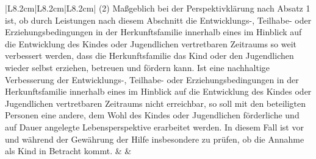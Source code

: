 \documentclass[10pt,a4paper,landscape]{article}
\begin{document}
\begin{longtable}{|L{8.2cm}|L{8.2cm}|L{8.2cm}|}
\textcolor{diffred}{(2) Maßgeblich bei der Perspektivklärung  \newline nach Absatz 1 ist, ob durch Leistungen  \newline nach diesem Abschnitt die Entwicklungs-,  \newline Teilhabe- oder Erziehungsbedingungen in  \newline der Herkunftsfamilie innerhalb eines im  \newline Hinblick auf die Entwicklung des Kindes  \newline oder Jugendlichen vertretbaren Zeitraums  \newline so weit verbessert werden, dass die  \newline Herkunftsfamilie das Kind oder den  \newline Jugendlichen wieder selbst erziehen,  \newline betreuen und fördern kann. Ist eine  \newline nachhaltige Verbesserung der  \newline Entwicklungs-, Teilhabe- oder  \newline Erziehungsbedingungen in der  \newline Herkunftsfamilie innerhalb eines im  \newline Hinblick auf die Entwicklung des Kindes  \newline oder Jugendlichen vertretbaren Zeitraums  \newline nicht erreichbar, so soll mit den beteiligten  \newline Personen eine andere, dem Wohl des  \newline Kindes oder Jugendlichen förderliche und  \newline auf Dauer angelegte Lebensperspektive  \newline erarbeitet werden. In diesem Fall ist vor  \newline und während der Gewährung der Hilfe  \newline insbesondere zu prüfen, ob die Annahme  \newline als Kind in Betracht kommt. } &  &  \\
\hhline{|---|}

\end{longtable}
\end{document}
